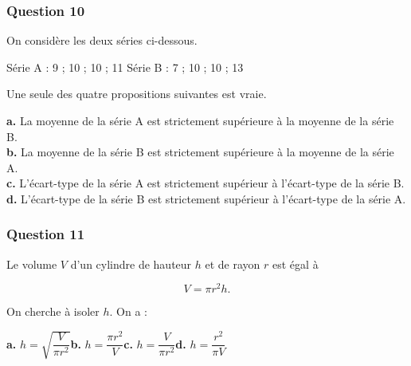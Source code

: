 \documentclass[10pt]{article}
\begin{document}
\subsubsection*{Question 10}
On considère les deux séries ci-dessous.

Série A : 9 ; 10 ; 10 ; 11 \hfill Série B : 7 ; 10 ; 10 ; 13

Une seule des quatre propositions suivantes est vraie.

\textbf{a.} La moyenne de la série A est strictement supérieure à la moyenne de la série B. \\
\textbf{b.} La moyenne de la série B est strictement supérieure à la moyenne de la série A. \\
\textbf{c.} L'écart-type de la série A est strictement supérieur à l'écart-type de la série B. \\
\textbf{d.} L'écart-type de la série B est strictement supérieur à l'écart-type de la série A.

\subsubsection*{Question 11}
Le volume $V$ d'un cylindre de hauteur $h$ et de rayon $r$ est égal à

\[V = \pi r^2 h.\]

On cherche à isoler $h$. On a :

\textbf{a.} $h = \sqrt{\dfrac{V}{\pi r^2}}$\hfill \textbf{b.} $h = \dfrac{\pi r^2}{V}$\hfill \textbf{c.} $h = \dfrac{V}{\pi r^2}$\hfill \textbf{d.} $h = \dfrac{r^2}{\pi V}$

\bigskip
\end{document}
